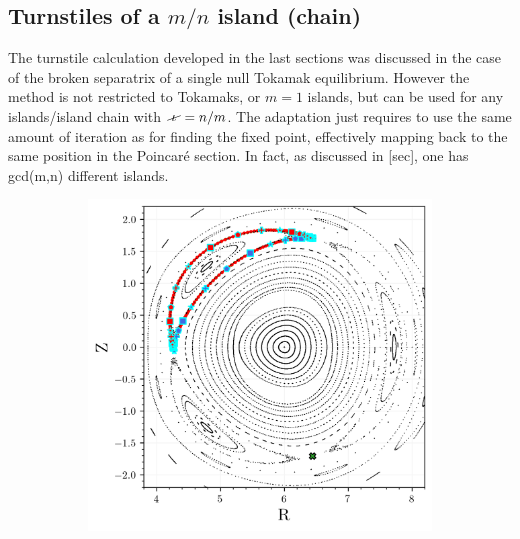 \subsection{Turnstiles of a $m/n$ island (chain)}

The turnstile calculation developed in the last sections 
was discussed in the case of the broken separatrix of a single null Tokamak equilibrium. However the method is not restricted to Tokamaks, or $m=1$ islands, but can be used for any islands/island chain with $\iotaslash = n/m$. The adaptation just requires to use the same amount of iteration as for finding the fixed point, effectively mapping back to the same position in the Poincaré section. In fact, as discussed in [sec], one has gcd(m,n) different islands.

\begin{figure}[h!]
    \centering
    \begin{subfigure}[c]{0.49\textwidth}
        \centering
        \includegraphics[width=\textwidth]{images/high-aspect-ratio/heteroclinics_outer_3.png}
        \caption{}
    \end{subfigure}
    \hfill
    \begin{subfigure}[c]{0.49\textwidth}
        \centering

\end{subfigure}
\end{figure}
